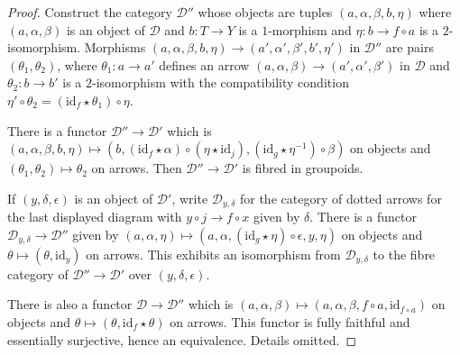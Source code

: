 \begin{proof}
Construct the category $\mathcal{D}''$ whose objects are tuples
$(a,\alpha,\beta,b,\eta)$
where $(a,\alpha,\beta)$ is an object of $\mathcal{D}$ and
$b \colon T \rightarrow Y$ is a $1$-morphism
and $\eta \colon b \rightarrow f \circ a$ is a $2$-isomorphism.
Morphisms $(a,\alpha,\beta,b,\eta) \rightarrow (a',\alpha',\beta',b',\eta')$
in $\mathcal{D}''$
are pairs $(\theta_1,\theta_2)$, where $\theta_1 \colon a \rightarrow a'$
defines an arrow $(a, \alpha, \beta) \rightarrow (a', \alpha', \beta')$
in $\mathcal{D}$ and $\theta_2 \colon b \rightarrow b'$ is a $2$-isomorphism
with the compatibility condition
$\eta' \circ \theta_2 = (\text{id}_f \star \theta_1) \circ \eta$.

\medskip\noindent
There is a functor $\mathcal{D}'' \rightarrow \mathcal{D}'$ which is
$(a, \alpha, \beta, b, \eta) \mapsto
(b, (\text{id}_f \star \alpha) \circ (\eta \star \text{id}_j),
(\text{id}_g \star \eta^{-1}) \circ \beta)$
on objects and $(\theta_1,\theta_2) \mapsto \theta_2$ on arrows.
Then $\mathcal{D}'' \rightarrow \mathcal{D}'$ is fibred in groupoids.

\medskip\noindent
If $(y, \delta, \epsilon)$ is an object of $\mathcal{D}'$, write
$\mathcal{D}_{y,\delta}$
for the category of dotted arrows for the last displayed diagram with
$y \circ j \rightarrow f \circ x$ given by $\delta$.
There is a functor $\mathcal{D}_{y,\delta} \rightarrow \mathcal{D}''$ given by
$(a, \alpha, \eta) \mapsto
(a, \alpha, (\text{id}_g \star \eta) \circ \epsilon, y, \eta)$
on objects and $\theta \mapsto (\theta, \text{id}_y)$ on arrows.
This exhibits an isomorphism from $\mathcal{D}_{y,\delta}$ to
the fibre category of $\mathcal{D}'' \rightarrow \mathcal{D}'$ over
$(y,\delta,\epsilon)$.

\medskip\noindent
There is also a functor $\mathcal{D} \rightarrow \mathcal{D}''$ which is
$(a,\alpha,\beta) \mapsto (a,\alpha,\beta,f \circ a, \text{id}_{f \circ a})$
on objects and $\theta \mapsto (\theta, \text{id}_f \star \theta)$ on arrows.
This functor is fully faithful and essentially surjective, hence an
equivalence. Details omitted.
\end{proof}



